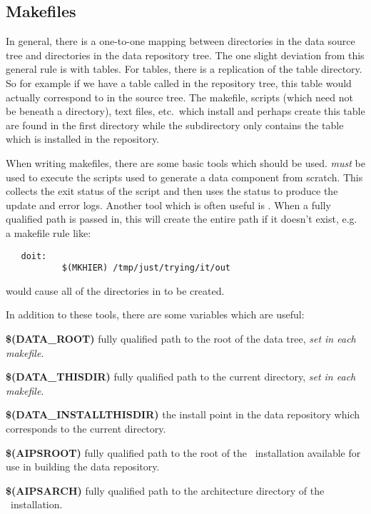 \subsection*{Makefiles}
In general, there is a one-to-one mapping between directories in
the data source tree and directories in the data repository tree.
The one slight deviation from this general rule is with tables.
For tables, there is a replication of the table directory. So for
example if we have a table called  in the
repository tree, this table would actually correspond to
 in the source tree. The makefile,
scripts (which need not be beneath a  directory),
text files, etc.~which install and perhaps create this table are
found in the first  directory while the 
subdirectory only contains the table which is installed in the
repository.

When writing makefiles, there are some basic tools which should be
used.  \textit{must} be used to execute the scripts
used to generate a data component from scratch. This collects the
exit status of the script and then uses the status to produce the
update and error logs. Another tool which is often useful is
. When a fully qualified path is passed in, this
will create the entire path if it doesn't exist, e.g. a makefile
rule like:

\begin{verbatim}
   doit:
           $(MKHIER) /tmp/just/trying/it/out
\end{verbatim}

\noindent
would cause all of the directories in 
to be created.

In addition to these tools, there are some variables which are useful:

\begin{list}{}{\setlength{\rightmargin}{\leftmargin}}

\item{\textbf{\$(DATA\_ROOT)}} fully qualified path to the root of the
data tree, \textit{set in each makefile}.

\item{\textbf{\$(DATA\_THISDIR)}} fully qualified path to the current
directory, \textit{set in each makefile}.

\item{\textbf{\$(DATA\_INSTALLTHISDIR)}} the install point in the data
repository which corresponds to the current directory.

\item{\textbf{\$(AIPSROOT)}} fully qualified path to the root of the
\aipspp\ installation available for use in building the data repository.

\item{\textbf{\$(AIPSARCH)}} fully qualified path to the architecture
directory of the \aipspp\ installation.

\end{list}

